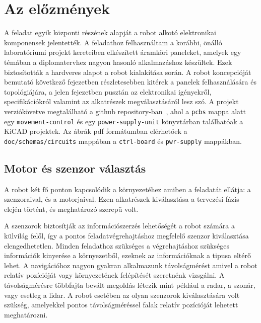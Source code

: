 \section{Az előzmények}

A feladat egyik központi részének alapját a robot alkotó elektronikai komponensek
jelentették. A feladathoz felhasználtam a korábbi, önálló laboratóriumi projekt
kereteiben elkészített áramköri paneleket, amelyek egy témában a diplomatervhez
nagyon hasonló alkalmazáshoz készültek. Ezek biztosították a hardveres alapot a
robot kialakítása során.  A robot koncepcióját bemutató következő fejezetben
részletesebben kitérek a panelek felhasználására és topológiájára, a jelen
fejezetben pusztán az elektronikai igényekről, specifikációkról valamint az
alkatrészek megválasztásáról lesz szó. A projekt verziókövetve megtalálható a
github repository-ban~\cite{RpirobotGitrepo}, ahol a \verb|pcbs| mappa alatt egy
\verb|movement-control| és egy \verb|power-supply-unit| könyvtárban találhatóak a
KiCAD projektek. Az ábrák pdf formátumban elérhetőek a
\verb|doc/schemas/circuits| mappában a \verb|ctrl-board| és \verb|pwr-supply|
mappákban.

\subsection{Motor és szenzor választás}

A robot két fő ponton kapcsolódik a környezetéhez amiben a feladatát ellátja: a
szenzoraival, és a motorjaival. Ezen alkatrészek kiválasztása a tervezési fázis
elején történt, és meghatározó szerepű volt.

\medskip

A szenzorok biztosítják az információszerzés lehetőségét a robot számára a
külvilág felől, így a pontos feladatvégrehajtáshoz megfelelő szenzor kiválasztása
elengedhetetlen.  Minden feladathoz szükséges a végrehajtáshoz szükséges
információk kinyerése a környezetből, ezeknek az információknak a tipusa eltérő
lehet. A navigációhoz nagyon gyakran alkalmazunk távolságmérést amivel a robot
relatív pozícióját vagy környezetének felépítését szeretnénk vizsgálni.  A
távolságmérésre többfajta bevált megoldás létezik mint például a radar, a szonár,
vagy esetleg a lidar. A robot esetében az olyan szenzorok kiválasztására volt
szükség, amelyekkel pontos távolságméréssel falak relatív pozícióját lehetett
meghatározni.

